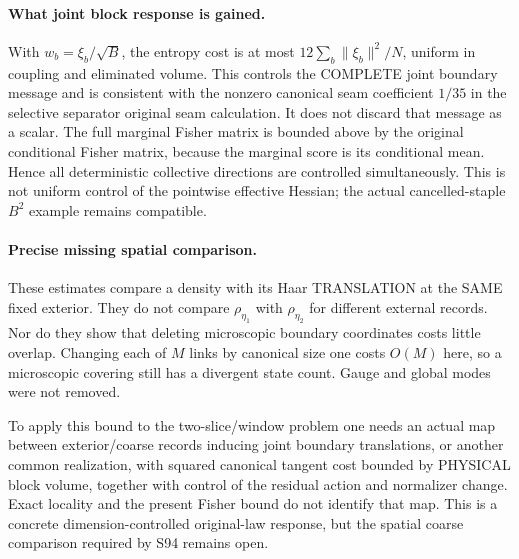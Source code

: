 \documentclass{article}
\begin{document}
\paragraph{What joint block response is gained.}
With $w_b=\xi_b/\sqrt B$, the entropy cost is at most
$12\sum_b\|\xi_b\|^2/N$, uniform in coupling and eliminated volume.
This controls the COMPLETE joint boundary message and is consistent with the nonzero canonical seam coefficient $1/35$ in the selective separator original seam calculation. It does not discard that message as a scalar.
The full marginal Fisher matrix is bounded above by the original conditional Fisher matrix, because the marginal score is its conditional mean. Hence all deterministic collective directions are controlled simultaneously.
This is not uniform control of the pointwise effective Hessian; the actual cancelled-staple $B^2$ example remains compatible.

\paragraph{Precise missing spatial comparison.}
These estimates compare a density with its Haar TRANSLATION at the SAME fixed exterior.
They do not compare $\rho_{\eta_1}$ with $\rho_{\eta_2}$ for different external records.
Nor do they show that deleting microscopic boundary coordinates costs little overlap.
Changing each of $M$ links by canonical size one costs $O(M)$ here, so a microscopic covering still has a divergent state count. Gauge and global modes were not removed.

To apply this bound to the two-slice/window problem one needs an actual map between exterior/coarse records inducing joint boundary translations, or another common realization, with squared canonical tangent cost bounded by PHYSICAL block volume, together with control of the residual action and normalizer change. Exact locality and the present Fisher bound do not identify that map. This is a concrete dimension-controlled original-law response, but the spatial coarse comparison required by S94 remains open.
\end{document}
